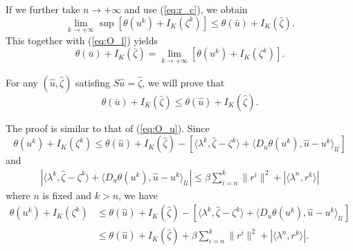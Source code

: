 \documentclass[leqno]{amsart}
\theoremstyle{definition}
\begin{document}
If we further take $n\rightarrow + \infty$ and use (\ref{eq:r_c}), we obtain
\begin{equation}\label{eq:O_u}
\lim\limits_{k\rightarrow +\infty}\sup[\theta(u^k) + I_K(\zeta^k)] \leq \theta(\bar{u}) + I_K(\bar{\zeta}).
\end{equation}
This together with (\ref{eq:O_l}) yields
\begin{equation}\label{eq:O_c}
\theta(\bar{u}) + I_K(\bar{\zeta}) = \lim\limits_{k\rightarrow +\infty}[\theta(u^k) + I_K(\zeta^k)].
\end{equation}

For any $(\hat{u},\hat{\zeta})$ satisfing $S\hat{u} = \hat{\zeta}$, we will prove that
$$ \theta(\bar{u}) + I_K(\bar{\zeta})\leq  \theta(\hat{u}) + I_K(\hat{\zeta}).$$

The proof is similar to that of (\ref{eq:O_u}). Since
$$ \theta(u^k) + I_K(\zeta^k) \leq \theta(\hat{u}) + I_K(\hat{\zeta}) - [ \langle \lambda^k, \hat{\zeta} - \zeta^k\rangle + \langle D_u\theta(u^k), \hat{u} - u^k \rangle_\mathcal{U}]$$
and
\begin{equation}\nonumber
\begin{aligned}
 |\langle \lambda^k, \hat{\zeta} - \zeta^k\rangle + \langle D_u\theta(u^k), \hat{u} - u^k \rangle_\mathcal{U}|
 \leq \beta\sum\limits_{i = n}^{k}\|r^{i}\|^2 + |\langle \lambda^n, r^k\rangle|
\end{aligned}
\end{equation}
where $n$ is fixed and $k>n$, we have
\begin{equation}\nonumber
\begin{aligned}
\theta(u^k) + I_K(\zeta^k) 
& \leq \theta(\hat{u}) + I_K(\hat{\zeta}) - [ \langle \lambda^k, \hat{\zeta} - \zeta^k\rangle + \langle D_u\theta(u^k), \hat{u} - u^k \rangle_\mathcal{U}] \\
& \leq \theta(\hat{u}) + I_K(\hat{\zeta}) + \beta\sum\limits_{i = n}^{k}\|r^{i}\|^2 + |\langle \lambda^n, r^k\rangle|.
\end{aligned}
\end{equation}
\end{document}
